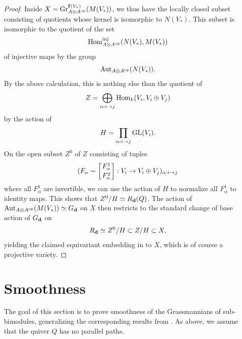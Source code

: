 \documentclass[12pt,a4paper]{amsart}
\numberwithin{equation}{section}
\theoremstyle{remark}
\begin{document}
\begin{proof}
Inside $X={\rm Gr}^{{\bf f}(V_*)}_{A\otimes A^{\rm op}}(M(V_*))$, we thus have the locally closed subset consisting of quotients whose kernel is isomorphic to $N(V_*)$. This subset is isomorphic to the quotient of the set
$${\rm Hom}^{\rm inj}_{A\otimes A^{\rm op}}(N(V_*),M(V_*))$$
of injective maps by the group
$${\rm Aut}_{A\otimes A^{\rm op}}(N(V_*)).$$
By the above calculation, this is nothing else than the quotient of
$$Z=\bigoplus_{\alpha:i\rightarrow j}{\rm Hom}_k(V_i, V_i\oplus V_j)$$
by the action of
$$H=\prod_{\alpha:i\rightarrow j}{\rm GL}(V_i).$$
On the open subset $Z^0$ of $Z$ consisting of tuples 
$$(F_\alpha=\left[F_\alpha^1\atop F_\alpha^2\right]:V_i\rightarrow V_i\oplus V_j)_{\alpha:i\rightarrow j}$$ 
where all $F^1_\alpha$ are invertible, we can use the action of $H$ to normalize all 
$F^1_\alpha$ to identity maps.  This shows that $Z^0/H\simeq R_{\bf d}(Q)$. 
The action of ${\rm Aut}_{A\otimes A^{\rm op}}(M(V_*))\simeq G_{\bf d}$ on $X$ 
then restricts to the standard change of base action of $G_{\bf d}$ on 
$$R_{\bf d}\simeq Z^0/H\subset Z/H\subset X,$$
yielding the claimed equivariant embedding in to $X$, which is of course a projective variety.
\end{proof}


\section{Smoothness}\label{sec:smoothness}
The goal of this section is to prove smoothness of the Grassmannians of sub-bimodules,
generalizing the corresponding results from \cite{L25}. 
As above, we assume that the quiver $Q$ has no parallel paths. 
\end{document}
